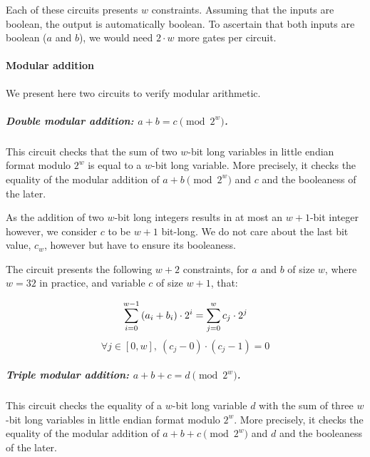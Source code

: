 Each of these circuits presents $w$ constraints. Assuming that the inputs are boolean, the output is automatically boolean. To ascertain that both inputs are boolean ($a$ and $b$), we would need $2\cdot w$ more gates per circuit.


\paragraph{Modular addition}\label{implementation:efficiency:blake:helper-circuits:modular-addition}

We present here two circuits to verify modular arithmetic.

\subparagraph{Double modular addition: {\boldmath $a + b = c \pmod {2^w}$}.}

This circuit checks that the sum of two $w$-bit long variables in little endian format modulo ${2^w}$ is equal to a $w$-bit long variable. More precisely, it checks the equality of the modular addition of $a+b \pmod {2^w}$ and $c$ and the booleaness of the later. 

As the addition of two $w$-bit long integers results in at most an $w+1$-bit integer however, we consider $c$ to be $w+1$ bit-long. We do not care about the last bit value, $c_w$, however but have to ensure its booleaness.

The circuit presents the following $w+2$ constraints, for $a$ and $b$ of size $w$, where $w=32$ in practice, and variable $c$ of size $w+1$, that:

\begin{equation}
  \label{implementation:eq:modular_sum}
  \sum_{i=0}^{w - 1} \left( a_i + b_i \right ) \cdot 2^i = \sum_{j=0}^{w} c_j \cdot 2^j\\
\end{equation}
\begin{equation}
  \label{implementation:eq:modular_bool}
  \forall j \in [ 0, w ],\ (c_j - 0) \cdot (c_j - 1) = 0
\end{equation}

\subparagraph{Triple modular addition: {\boldmath $a + b + c = d \pmod {2^w}$}.}

This circuit checks the equality of a $w$-bit long variable $d$ with the sum of three $w$-bit long variables in little endian format modulo ${2^w}$. More precisely, it checks the equality of the modular addition of $a+b+c \pmod {2^w}$ and $d$ and the booleaness of the later. 


